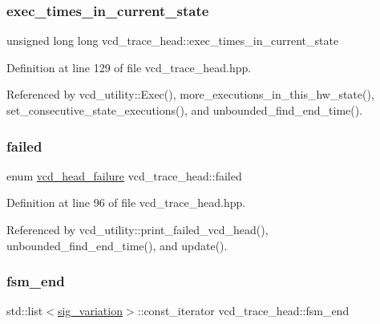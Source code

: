 \subsubsection{\texorpdfstring{exec\+\_\+times\+\_\+in\+\_\+current\+\_\+state}{exec\_times\_in\_current\_state}}
{\footnotesize\ttfamily unsigned long long vcd\+\_\+trace\+\_\+head\+::exec\+\_\+times\+\_\+in\+\_\+current\+\_\+state}



Definition at line 129 of file vcd\+\_\+trace\+\_\+head.\+hpp.



Referenced by vcd\+\_\+utility\+::\+Exec(), more\+\_\+executions\+\_\+in\+\_\+this\+\_\+hw\+\_\+state(), set\+\_\+consecutive\+\_\+state\+\_\+executions(), and unbounded\+\_\+find\+\_\+end\+\_\+time().

\mbox{\label{structvcd__trace__head_a6395cfe9499ffeca14aba741fdd68253}} 
\subsubsection{\texorpdfstring{failed}{failed}}
{\footnotesize\ttfamily enum \hyperlink{structvcd__trace__head_ad0e9ddff3ce422e4273ae6ccbb2a88f8}{vcd\+\_\+head\+\_\+failure} vcd\+\_\+trace\+\_\+head\+::failed}



Definition at line 96 of file vcd\+\_\+trace\+\_\+head.\+hpp.



Referenced by vcd\+\_\+utility\+::print\+\_\+failed\+\_\+vcd\+\_\+head(), unbounded\+\_\+find\+\_\+end\+\_\+time(), and update().

\mbox{\label{structvcd__trace__head_a696d35a8e999fbf0f18e78d5312fd8bf}} 
\subsubsection{\texorpdfstring{fsm\+\_\+end}{fsm\_end}}
{\footnotesize\ttfamily std\+::list$<$\hyperlink{structsig__variation}{sig\+\_\+variation}$>$\+::const\+\_\+iterator vcd\+\_\+trace\+\_\+head\+::fsm\+\_\+end}



